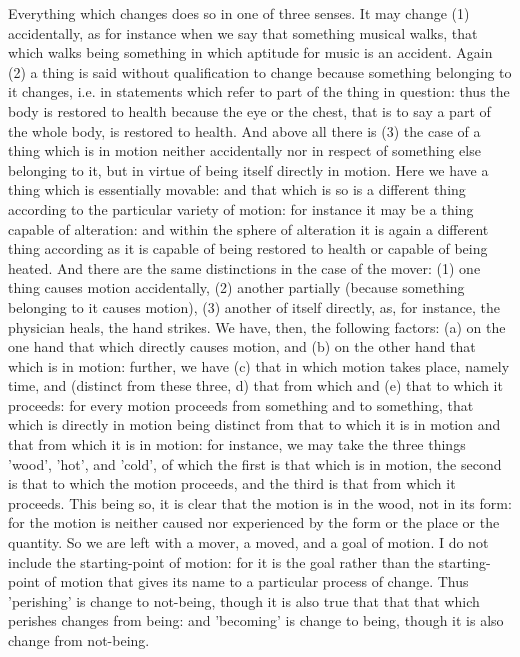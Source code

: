 Everything which changes does so in one of three senses. It may change
(1) accidentally, as for instance when we say that something musical
walks, that which walks being something in which aptitude for music
is an accident. Again (2) a thing is said without qualification to
change because something belonging to it changes, i.e. in statements
which refer to part of the thing in question: thus the body is restored
to health because the eye or the chest, that is to say a part of the
whole body, is restored to health. And above all there is (3) the
case of a thing which is in motion neither accidentally nor in respect
of something else belonging to it, but in virtue of being itself directly
in motion. Here we have a thing which is essentially movable: and
that which is so is a different thing according to the particular
variety of motion: for instance it may be a thing capable of alteration:
and within the sphere of alteration it is again a different thing
according as it is capable of being restored to health or capable
of being heated. And there are the same distinctions in the case of
the mover: (1) one thing causes motion accidentally, (2) another partially
(because something belonging to it causes motion), (3) another of
itself directly, as, for instance, the physician heals, the hand strikes.
We have, then, the following factors: (a) on the one hand that which
directly causes motion, and (b) on the other hand that which is in
motion: further, we have (c) that in which motion takes place, namely
time, and (distinct from these three, d) that from which and (e)
that to which it proceeds: for every motion proceeds from something
and to something, that which is directly in motion being distinct
from that to which it is in motion and that from which it is in motion:
for instance, we may take the three things 'wood', 'hot', and 'cold',
of which the first is that which is in motion, the second is that
to which the motion proceeds, and the third is that from which it
proceeds. This being so, it is clear that the motion is in the wood,
not in its form: for the motion is neither caused nor experienced
by the form or the place or the quantity. So we are left with a mover,
a moved, and a goal of motion. I do not include the starting-point
of motion: for it is the goal rather than the starting-point of motion
that gives its name to a particular process of change. Thus 'perishing'
is change to not-being, though it is also true that that that which
perishes changes from being: and 'becoming' is change to being, though
it is also change from not-being. 

